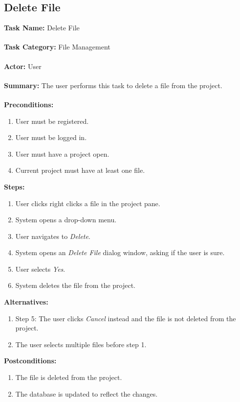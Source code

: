\documentclass[14pt, a4paper]{article}
\begin{document}
\newpage

\subsection{Delete File}

\begin{framed}
	\noindent\textbf{Task Name:} Delete File \\ \\
	\textbf{Task Category:} File Management \\ \\
	\textbf{Actor:} User \\ \\
	\textbf{Summary:} The user performs this task to delete a file from the project. \\ \\
	\textbf{Preconditions:} 
	\begin{enumerate}
		\item User must be registered.
		\item User must be logged in.
		\item User must have a project open.
		\item Current project must have at least one file.
	\end{enumerate}
	\textbf{Steps:}
	\begin{enumerate}
		\item User clicks right clicks a file in the project pane.
		\item System opens a drop-down menu.
		\item User navigates to \textit{Delete}.
		\item System opens an \textit{Delete File} dialog window, asking if the user is sure.
		\item User selects \textit{Yes}.
		\item System deletes the file from the project.
	\end{enumerate}
	\textbf{Alternatives:} 
	\begin{enumerate}
		\item Step 5: The user clicks \textit{Cancel} instead and the file is not deleted from the project.
		\item The user selects multiple files before step 1.
	\end{enumerate}
	\textbf{Postconditions:}
	\begin{enumerate}
		\item The file is deleted from the project.
		\item The database is updated to reflect the changes.
	\end{enumerate}
\end{framed} 
\end{document}
